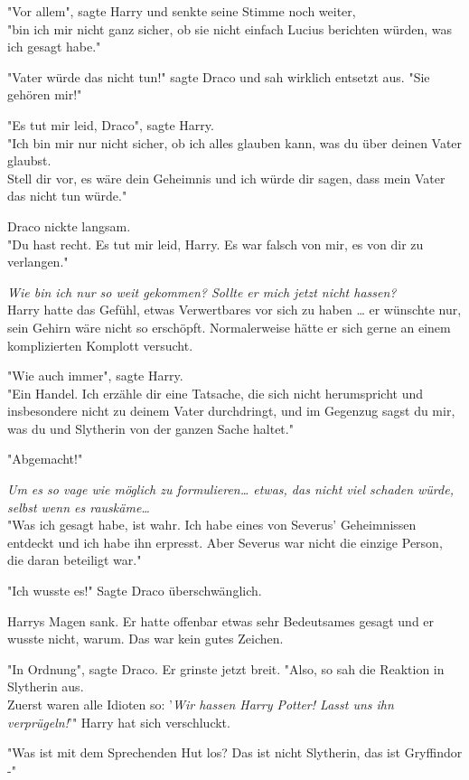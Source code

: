 {"Vor allem", sagte Harry und senkte seine Stimme noch weiter,\\ "bin ich mir nicht ganz sicher, ob sie nicht einfach Lucius berichten würden, was ich gesagt habe."

"Vater würde das nicht tun!" sagte Draco und sah wirklich entsetzt aus. "Sie gehören mir!"

"Es tut mir leid, Draco", sagte Harry.\\ "Ich bin mir nur nicht sicher, ob ich alles glauben kann, was du über deinen Vater glaubst.\\ Stell dir vor, es wäre dein Geheimnis und ich würde dir sagen, dass mein Vater das nicht tun würde."

Draco nickte langsam.\\ "Du hast recht. Es tut mir leid, Harry. Es war falsch von mir, es von dir zu verlangen."

\emph{Wie bin ich nur so weit gekommen? Sollte er mich jetzt nicht hassen?}\\ Harry hatte das Gefühl, etwas Verwertbares vor sich zu haben … er wünschte nur, sein Gehirn wäre nicht so erschöpft. Normalerweise hätte er sich gerne an einem komplizierten Komplott versucht.

"Wie auch immer", sagte Harry.\\ "Ein Handel. Ich erzähle dir eine Tatsache, die sich nicht herumspricht und insbesondere nicht zu deinem Vater durchdringt, und im Gegenzug sagst du mir, was du und Slytherin von der ganzen Sache haltet."

"Abgemacht!"

\emph{Um es so vage wie möglich zu formulieren… etwas, das nicht viel schaden würde, selbst wenn es rauskäme…}\\ "Was ich gesagt habe, ist wahr. Ich habe eines von Severus' Geheimnissen entdeckt und ich habe ihn erpresst. Aber Severus war nicht die einzige Person, die daran beteiligt war."

"Ich wusste es!" Sagte Draco überschwänglich.

Harrys Magen sank. Er hatte offenbar etwas sehr Bedeutsames gesagt und er wusste nicht, warum. Das war kein gutes Zeichen.

"In Ordnung", sagte Draco. Er grinste jetzt breit. "Also, so sah die Reaktion in Slytherin aus.\\ Zuerst waren alle Idioten so: '\emph{Wir hassen Harry Potter! Lasst uns ihn verprügeln!}'" Harry hat sich verschluckt.

"Was ist mit dem Sprechenden Hut los? Das ist nicht Slytherin, das ist Gryffindor -"

}
